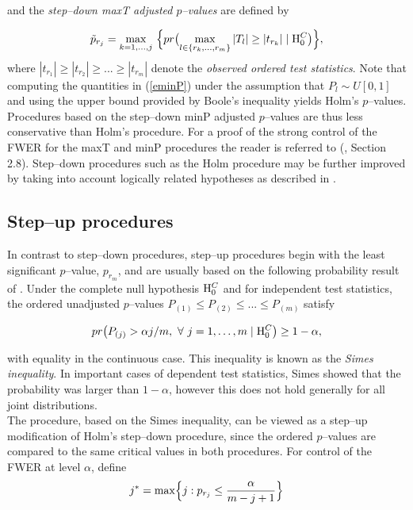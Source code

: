 \documentclass[11pt]{article}
\newcommand{\scst}{\scriptstyle}
\begin{document}
and the {\it step--down maxT adjusted $p$--values} are defined by

\begin{equation}\label{emaxTd}
\tilde{p}_{\scst r_j} = \max_{k = 1,\ldots, j}\ \Bigl\{ pr\bigl( \max_{l \in \{r_k,\ldots,r_m\}} |T_l| \geq |t_{\scst r_k}| \mid {\rm H}_0^C \bigr) \Bigr\},
\end{equation}
where $|t_{\scst r_1}| \geq |t_{\scst r_2}| \geq ... \geq |t_{\scst
  r_m}|$ denote the {\it observed ordered test statistics}. Note that
  computing the quantities in (\ref{eminP}) under the assumption that
  $P_l \sim U[0,1]$ and using the upper bound provided by Boole's
  inequality yields Holm's $p$--values. Procedures based on the
  step--down minP adjusted $p$--values are thus less conservative than
  Holm's procedure. For a proof of the strong control of the FWER for
  the maxT and minP procedures the reader is referred to (\cite{Westfall&Young93}, Section 2.8). Step--down procedures such as the Holm procedure may be further improved by taking into account logically related hypotheses as described in \cite{Shaffer86}.


\subsection{Step--up procedures}

In contrast to step--down procedures, step--up procedures begin with the
least significant $p$--value, $p_{\scst r_m}$, and are usually based on
the following probability result of \cite{Simes86}. Under the
complete null hypothesis ${\rm H}_0^C$ and for independent test
statistics, the ordered unadjusted $p$--values $P_{(1)} \leq
P_{(2)} \leq ... \leq P_{(m)}$ satisfy 

$$pr \bigl(P_{(j)} > \alpha j/m,\ \forall\ j= 1, \ldots, m \mid {\rm H}_0^C \bigr) \geq 1- \alpha,$$ 

with equality in the continuous case. This inequality is known as the {\it Simes inequality}. In important cases of dependent test statistics, Simes showed that the probability was larger than $1-\alpha$, however this does not hold generally for all joint distributions.\\

The \cite{Hochberg88} procedure, based on the Simes inequality, can be viewed as a step--up modification of Holm's step--down procedure, since the ordered $p$--values are compared to the same critical values in both procedures. For control of the FWER at level $\alpha$, define 
$$ j^* = \max \Bigl\{j: p_{\scst r_j} \leq \frac{\alpha}{m-j+1}\Bigr\}$$
\end{document}
